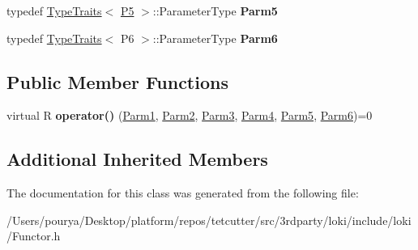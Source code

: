 \begin{DoxyCompactItemize}
\item 
\hypertarget{classLoki_1_1FunctorImpl_3_01R_00_01LOKI__TYPELIST__6_07P1_00_01P2_00_01P3_00_01P4_00_01P5_00_01P6_08_00_01ThreadingModel_01_4_a60ec0471e1b7df1cb766534e7653b623}{}typedef \hyperlink{classLoki_1_1TypeTraits}{Type\+Traits}$<$ \hyperlink{structP5}{P5} $>$\+::Parameter\+Type {\bfseries Parm5}\label{classLoki_1_1FunctorImpl_3_01R_00_01LOKI__TYPELIST__6_07P1_00_01P2_00_01P3_00_01P4_00_01P5_00_01P6_08_00_01ThreadingModel_01_4_a60ec0471e1b7df1cb766534e7653b623}

\item 
\hypertarget{classLoki_1_1FunctorImpl_3_01R_00_01LOKI__TYPELIST__6_07P1_00_01P2_00_01P3_00_01P4_00_01P5_00_01P6_08_00_01ThreadingModel_01_4_a75a656b9676a85af93abbeb3f57ed43a}{}typedef \hyperlink{classLoki_1_1TypeTraits}{Type\+Traits}$<$ P6 $>$\+::Parameter\+Type {\bfseries Parm6}\label{classLoki_1_1FunctorImpl_3_01R_00_01LOKI__TYPELIST__6_07P1_00_01P2_00_01P3_00_01P4_00_01P5_00_01P6_08_00_01ThreadingModel_01_4_a75a656b9676a85af93abbeb3f57ed43a}

\end{DoxyCompactItemize}
\subsection*{Public Member Functions}
\begin{DoxyCompactItemize}
\item 
\hypertarget{classLoki_1_1FunctorImpl_3_01R_00_01LOKI__TYPELIST__6_07P1_00_01P2_00_01P3_00_01P4_00_01P5_00_01P6_08_00_01ThreadingModel_01_4_a4fa33b88080853ea812d2f08bf8b9205}{}virtual R {\bfseries operator()} (\hyperlink{classLoki_1_1EmptyType}{Parm1}, \hyperlink{classLoki_1_1EmptyType}{Parm2}, \hyperlink{classLoki_1_1EmptyType}{Parm3}, \hyperlink{classLoki_1_1EmptyType}{Parm4}, \hyperlink{classLoki_1_1EmptyType}{Parm5}, \hyperlink{classLoki_1_1EmptyType}{Parm6})=0\label{classLoki_1_1FunctorImpl_3_01R_00_01LOKI__TYPELIST__6_07P1_00_01P2_00_01P3_00_01P4_00_01P5_00_01P6_08_00_01ThreadingModel_01_4_a4fa33b88080853ea812d2f08bf8b9205}

\end{DoxyCompactItemize}
\subsection*{Additional Inherited Members}


The documentation for this class was generated from the following file\+:\begin{DoxyCompactItemize}
\item 
/\+Users/pourya/\+Desktop/platform/repos/tetcutter/src/3rdparty/loki/include/loki/Functor.\+h\end{DoxyCompactItemize}

